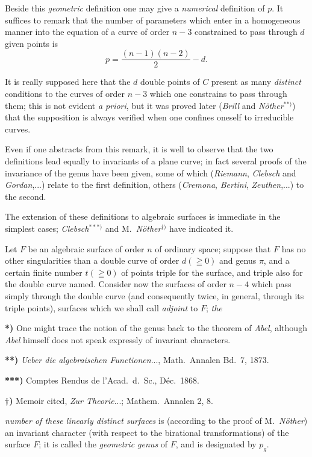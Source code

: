 \documentclass{article}
\begin{document}
Beside this \emph{geometric} definition one may give a \emph{numerical} definition of $p$. It suffices to remark that the number of parameters which enter in a homogeneous manner into the equation of a curve of order $n-3$ constrained to pass through $d$ given points is
\[
p = \frac{(n-1)(n-2)}{2} - d.
\]

It is really supposed here that the $d$ double points of $C$ present as many \emph{distinct} conditions to the curves of order $n-3$ which one constrains to pass through them; this is not evident \emph{a priori}, but it was proved later (\emph{Brill} and \emph{Nöther}${}^{**)}$) that the supposition is always verified when one confines oneself to irreducible curves.

Even if one abstracts from this remark, it is well to observe that the two definitions lead equally to invariants of a plane curve; in fact several proofs of the invariance of the genus have been given, some of which (\emph{Riemann}, \emph{Clebsch} and \emph{Gordan},...) relate to the first definition, others (\emph{Cremona}, \emph{Bertini}, \emph{Zeuthen},...) to the second.

The extension of these definitions to algebraic surfaces is immediate in the simplest cases; \emph{Clebsch}${}^{***)}$ and M.\ \emph{Nöther}${}^{\dagger)}$ have indicated it.

Let $F$ be an algebraic surface of order $n$ of ordinary space; suppose that $F$ has no other singularities than a double curve of order $d(\geqq 0)$ and genus $\pi$, and a certain finite number $t(\geqq 0)$ of points triple for the surface, and triple also for the double curve named. Consider now the surfaces of order $n-4$ which pass simply through the double curve (and consequently twice, in general, through its triple points), surfaces which we shall call \emph{adjoint} to $F$; \emph{the}

\textbf{*)} One might trace the notion of the genus back to the theorem of \emph{Abel}, although \emph{Abel} himself does not speak expressly of invariant characters.

\textbf{**)} \emph{Ueber die algebraischen Functionen}..., Math.\ Annalen Bd.\ 7, 1873.

\textbf{***)} Comptes Rendus de l'Acad.\ d.\ Sc., Déc.\ 1868.

\textbf{†)} Memoir cited, \emph{Zur Theorie}...; Mathem.\ Annalen 2, 8.

\emph{number of these linearly distinct surfaces} is (according to the proof of M.\ \emph{Nöther}) an invariant character (with respect to the birational transformations) of the surface $F$; it is called the \emph{geometric genus} of $F$, and is designated by $p_{g}$.
\end{document}
